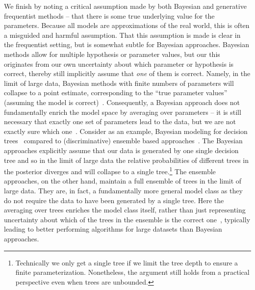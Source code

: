 We finish by noting a critical assumption made by both Bayesian and generative frequentist methods --
that there is some true underlying value for the parameters.  Because
all models are approximations of the real world, this is often a misguided and harmful assumption.  That this assumption
is made is clear in the frequentist setting, but is somewhat subtle for Bayesian approaches.
Bayesian methods allow for multiple hypothesis or parameter values, but our this originates from our own uncertainty
about which parameter or hypothesis is correct, thereby still implicitly assume that \emph{one} of them is correct.
Namely, in the limit of large data, Bayesian methods with finite numbers of parameters will collapse to a point estimate, 
corresponding to the ``true parameter values'' (assuming the model is correct)~\citep{robert2007bayesian}.
Consequently, a Bayesian approach does not fundamentally enrich the model space by averaging over parameters -- it
is still necessary that exactly one set of parameters lead to the data, but we are not exactly sure which one~\citep{minka2000bayesian}.
Consider as an example, Bayesian modeling for decision trees~\cite{chipman1998bayesian,lakshminarayanan2013top}
compared to (discriminative) ensemble based approaches~\citep{breiman2001random,rainforth2015canonical}.
The Bayesian approaches explicitly assume that our data is generated by one single decision tree and so in the limit of
large data the relative probabilities of different trees in the posterior diverges and will collapse to a
single tree.\footnote{Technically we only get a single tree 
	if we limit the tree depth to ensure a finite parameterization.  Nonetheless, the argument still
	holds from a practical perspective even when trees are unbounded.}  The ensemble approaches, on the other hand, maintain
a full ensemble of trees in the limit of large data.  They are, in fact, a fundamentally more general model class
as they do not require the data to have been generated by a single tree.  Here the averaging over trees enriches the
model class itself, rather than just representing uncertainty about which of the trees in the ensemble is the correct 
one~\citep{domingos1997does}, typically leading to better performing algorithms for large datasets than Bayesian approaches.
